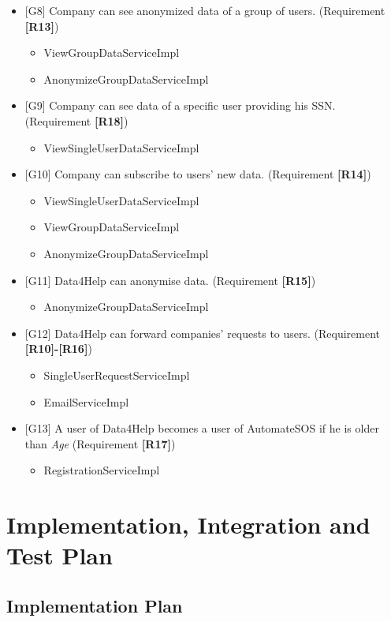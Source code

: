 \documentclass{article}
\begin{document}
\begin{itemize}
	\item {[G8]} Company can see anonymized data of a group of users. (Requirement \textbf{[R13]})
	\begin{itemize}
	\item ViewGroupDataServiceImpl
	\item AnonymizeGroupDataServiceImpl
	\end{itemize}
	\item {[G9]} Company can see data of a specific user providing his SSN. (Requirement \textbf{[R18]})
	\begin{itemize}
	\item ViewSingleUserDataServiceImpl
	\end{itemize}
	\item {[G10]} Company can subscribe to users' new data. (Requirement \textbf{[R14]})
	\begin{itemize}
	\item ViewSingleUserDataServiceImpl	
	\item ViewGroupDataServiceImpl
	\item AnonymizeGroupDataServiceImpl
	\end{itemize}
	\item {[G11]} Data4Help can anonymise data. (Requirement \textbf{[R15]})
	\begin{itemize}
	\item AnonymizeGroupDataServiceImpl
	\end{itemize}
	\item {[G12]} Data4Help can forward companies' requests to users. (Requirement \textbf{[R10]-[R16]})
	\begin{itemize}
	\item SingleUserRequestServiceImpl
	\item EmailServiceImpl
	\end{itemize}
	\item {[G13]} A user of Data4Help becomes a user of AutomateSOS if he is older than \emph{Age} (Requirement \textbf{[R17]})
	\begin{itemize}
	\item RegistrationServiceImpl
	\end{itemize}
\end{itemize}
\newpage
\section{Implementation, Integration and Test Plan}
\subsection{Implementation Plan}
\end{document}
